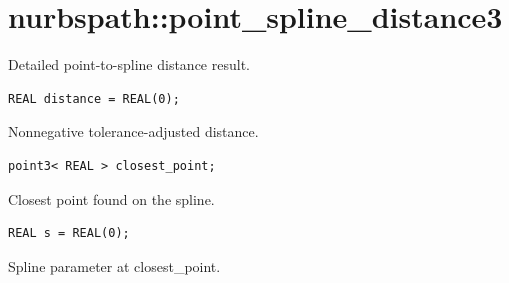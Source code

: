 \section{nurbspath::point\_spline\_distance3}
Detailed point-to-spline distance result.
\par\noindent\begin{minipage}{\linewidth}
\begin{lstlisting}[style=apireference]
REAL distance = REAL(0);
\end{lstlisting}
{\footnotesize Nonnegative tolerance-adjusted distance.\par}
\end{minipage}\par\vspace{1pt}
\par\noindent\begin{minipage}{\linewidth}
\begin{lstlisting}[style=apireference]
point3< REAL > closest_point;
\end{lstlisting}
{\footnotesize Closest point found on the spline.\par}
\end{minipage}\par\vspace{1pt}
\par\noindent\begin{minipage}{\linewidth}
\begin{lstlisting}[style=apireference]
REAL s = REAL(0);
\end{lstlisting}
{\footnotesize Spline parameter at closest\_point.\par}
\end{minipage}\par\vspace{1pt}
